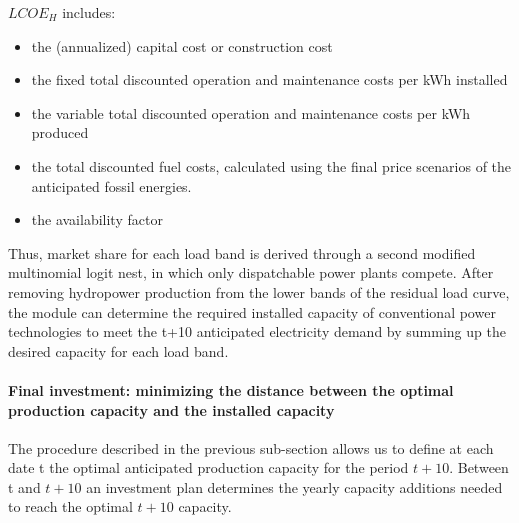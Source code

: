 $LCOE_{H}$ includes:

\begin{itemize}
    \item the (annualized) capital cost or construction cost
    \item the fixed total discounted operation and maintenance costs per kWh installed
    \item the variable total discounted operation and maintenance costs per kWh produced
    \item the total discounted fuel costs, calculated using the final price scenarios of the anticipated fossil energies.
    \item  the availability factor
\end{itemize}



Thus, market share for each load band is derived through a second modified multinomial logit nest, in which only dispatchable power plants compete. After removing hydropower production from the  lower bands of the residual load curve, the module can determine the required installed capacity of conventional power technologies to meet the t+10 anticipated electricity demand by summing up the desired capacity for each load band.



\paragraph{Final investment: minimizing the distance between the optimal production capacity and the installed capacity}

The procedure described in the previous sub-section allows us to define at each date t the optimal anticipated production capacity for the period $t+10$. Between t and $t+10$ an investment plan determines the yearly capacity additions needed to reach the optimal $t+10$ capacity.

